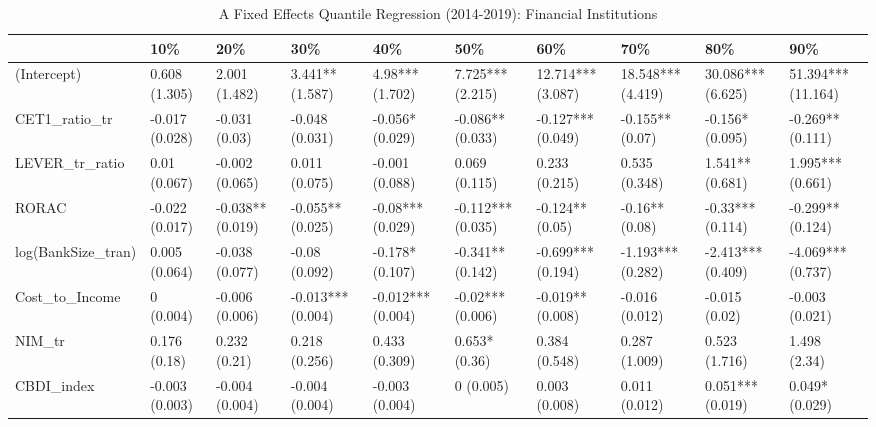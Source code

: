 \begin{table}[ht]
\centering
\caption{A Fixed Effects Quantile Regression (2014-2019): Financial Institutions} 
\begingroup\small
\begin{tabular}{llllllllll}
  \toprule
 & 10\% & 20\% & 30\% & 40\% & 50\% & 60\% & 70\% & 80\% & 90\% \\ 
  \midrule
(Intercept) & 0.608 (1.305) & 2.001 (1.482) & 3.441** (1.587) & 4.98*** (1.702) & 7.725*** (2.215) & 12.714*** (3.087) & 18.548*** (4.419) & 30.086*** (6.625) & 51.394*** (11.164) \\ 
  CET1\_ratio\_tr & -0.017 (0.028) & -0.031 (0.03) & -0.048 (0.031) & -0.056* (0.029) & -0.086** (0.033) & -0.127*** (0.049) & -0.155** (0.07) & -0.156* (0.095) & -0.269** (0.111) \\ 
  LEVER\_tr\_ratio & 0.01 (0.067) & -0.002 (0.065) & 0.011 (0.075) & -0.001 (0.088) & 0.069 (0.115) & 0.233 (0.215) & 0.535 (0.348) & 1.541** (0.681) & 1.995*** (0.661) \\ 
  RORAC & -0.022 (0.017) & -0.038** (0.019) & -0.055** (0.025) & -0.08*** (0.029) & -0.112*** (0.035) & -0.124** (0.05) & -0.16** (0.08) & -0.33*** (0.114) & -0.299** (0.124) \\ 
  log(BankSize\_tran) & 0.005 (0.064) & -0.038 (0.077) & -0.08 (0.092) & -0.178* (0.107) & -0.341** (0.142) & -0.699*** (0.194) & -1.193*** (0.282) & -2.413*** (0.409) & -4.069*** (0.737) \\ 
  Cost\_to\_Income & 0 (0.004) & -0.006 (0.006) & -0.013*** (0.004) & -0.012*** (0.004) & -0.02*** (0.006) & -0.019** (0.008) & -0.016 (0.012) & -0.015 (0.02) & -0.003 (0.021) \\ 
  NIM\_tr & 0.176 (0.18) & 0.232 (0.21) & 0.218 (0.256) & 0.433 (0.309) & 0.653* (0.36) & 0.384 (0.548) & 0.287 (1.009) & 0.523 (1.716) & 1.498 (2.34) \\ 
  CBDI\_index & -0.003 (0.003) & -0.004 (0.004) & -0.004 (0.004) & -0.003 (0.004) & 0 (0.005) & 0.003 (0.008) & 0.011 (0.012) & 0.051*** (0.019) & 0.049* (0.029) \\ 
   \bottomrule
\end{tabular}
\endgroup
\end{table}
